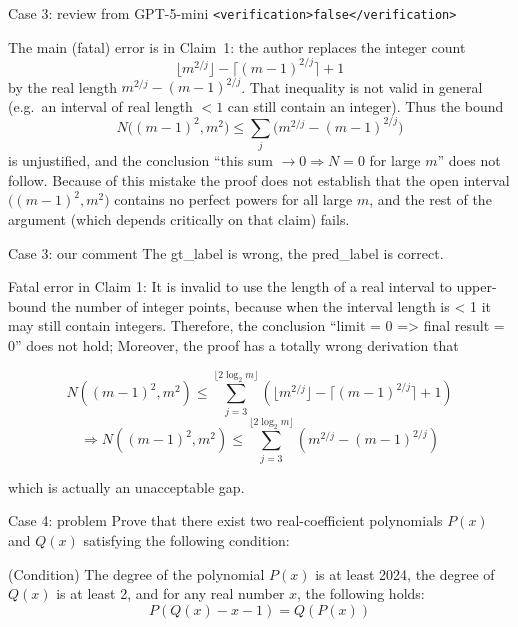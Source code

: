 \documentclass{article} %
\begin{document}
\begin{promptbox}{Case 3: review from GPT-5-mini}
\verb|<verification>false</verification>|

The main (fatal) error is in Claim~1: the author replaces the integer count
\[
\bigl\lfloor m^{2/j} \bigr\rfloor - \bigl\lceil (m-1)^{2/j} \bigr\rceil + 1
\]
by the real length \(m^{2/j} - (m-1)^{2/j}\). That inequality is not valid in general
(e.g.\ an interval of real length \(<1\) can still contain an integer). Thus the bound
\[
N\bigl((m-1)^2,m^2\bigr) \le \sum_j \bigl(m^{2/j} - (m-1)^{2/j}\bigr)
\]
is unjustified, and the conclusion “this sum \(\to 0 \Rightarrow N = 0\) for large \(m\)”
does not follow. Because of this mistake the proof does not establish that the open
interval \(\bigl((m-1)^2,m^2\bigr)\) contains no perfect powers for all large \(m\), and
the rest of the argument (which depends critically on that claim) fails.
\end{promptbox}
\begin{promptbox}{Case 3: our comment}
The gt\_label is wrong, the pred\_label is correct.

Fatal error in Claim 1: It is invalid to use the length of a real interval to upper-bound the number of integer points, because when the interval length is < 1 it may still contain integers. Therefore, the conclusion ``limit = 0 => final result = 0'' does not hold; Moreover, the proof has a totally wrong derivation that

$$N((m-1)^2, m^2) \le \sum_{j=3}^{\lfloor 2\log_2 m \rfloor} \left( \lfloor m^{2/j} \rfloor - \lceil (m-1)^{2/j} \rceil + 1 \right)$$
$$\Rightarrow N((m-1)^2, m^2) \le \sum_{j=3}^{\lfloor 2\log_2 m \rfloor} \left( m^{2/j} - (m-1)^{2/j} \right)$$

which is actually an unacceptable gap.
\end{promptbox}

\begin{promptbox}{Case 4: problem}
  Prove that there exist two real-coefficient polynomials $P(x)$ and $Q(x)$ satisfying the following condition:
  
  (Condition) The degree of the polynomial $P(x)$ is at least 2024, the degree of $Q(x)$ is at least 2, and for any real number $x$, the following holds:
  \[ P(Q(x)-x-1)=Q(P(x))\]
\end{promptbox}
\end{document}
